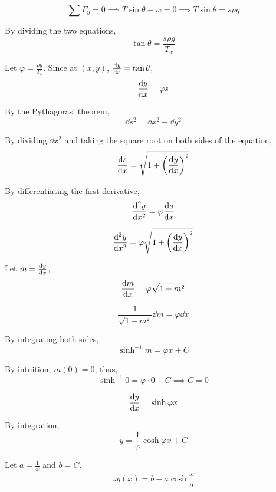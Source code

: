 \documentclass[a4paper]{article}
\begin{document}
\begin{equation}
    \sum F_y=0\implies T\sin\theta-w=0\implies T\sin\theta=s\rho g
\end{equation}

By dividing the two equations,
\begin{equation}
    \tan\theta=\frac{s\rho g}{T_x}
\end{equation}

Let \(\varphi=\frac{\rho g}{T_x}\). Since at \((x,y)\), \(\dv{y}{x}=\tan\theta\),
\begin{equation}
    \dv{y}{x}=\varphi s
\end{equation}

By the Pythagoras' theorem, 
\begin{equation}
    \dd{s}^2=\dd{x}^2+\dd{y}^2
\end{equation}

By dividing \(\dd{x}^2\) and taking the square root on both sides of the equation,
\begin{equation}
    \dv{s}{x}=\sqrt{1+\pqty{\dv{y}{x}}^2}
\end{equation}

By differentiating the first derivative,
\begin{equation}
    \dv[2]{y}{x}=\varphi\dv{s}{x}
\end{equation}

\begin{equation}
    \dv[2]{y}{x}=\varphi\sqrt{1+\pqty{\dv{y}{x}}^2}
\end{equation}

Let \(m=\dv{y}{x}\),
\begin{equation}
    \dv{m}{x}=\varphi\sqrt{1+m^2}
\end{equation}

\begin{equation}
    \frac1{\sqrt{1+m^2}}\dd{m}=\varphi\dd{x}
\end{equation}

By integrating both sides,
\begin{equation}
    \sinh^{-1}m=\varphi x+C
\end{equation}

By intuition, \(m(0)=0\), thus,
\begin{equation}
    \sinh^{-1}0=\varphi\cdot0+C\implies C=0
\end{equation}

\begin{equation}
    \dv{y}{x}=\sinh\varphi x
\end{equation}

By integration,
\begin{equation}
    y=\frac1\varphi\cosh\varphi x+C
\end{equation}

Let \(a=\frac1\varphi\) and \(b=C\).
\[\therefore\boxed{y(x)=b+a\cosh\frac xa}\]
\end{document}
